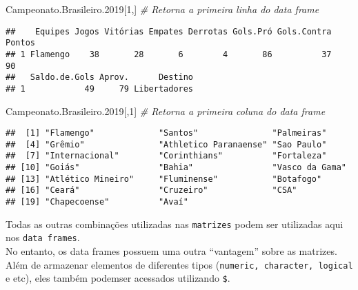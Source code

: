\documentclass[
]{book}
\newenvironment{Shaded}{\begin{snugshade}}{\end{snugshade}}
\newcommand{\CommentTok}[1]{\textcolor[rgb]{0.56,0.35,0.01}{\textit{#1}}}
\newcommand{\DecValTok}[1]{\textcolor[rgb]{0.00,0.00,0.81}{#1}}
\newcommand{\FloatTok}[1]{\textcolor[rgb]{0.00,0.00,0.81}{#1}}
\newcommand{\NormalTok}[1]{#1}
\newcommand{\SpecialCharTok}[1]{\textcolor[rgb]{0.00,0.00,0.00}{#1}}
\begin{document}
\begin{Shaded}
\begin{Highlighting}[]
\NormalTok{Campeonato.Brasileiro}\FloatTok{.2019}\NormalTok{[}\DecValTok{1}\NormalTok{,] }\CommentTok{\# Retorna a primeira linha do data frame}
\end{Highlighting}
\end{Shaded}

\begin{verbatim}
##    Equipes Jogos Vitórias Empates Derrotas Gols.Pró Gols.Contra Pontos
## 1 Flamengo    38       28       6        4       86          37     90
##   Saldo.de.Gols Aprov.      Destino
## 1            49     79 Libertadores
\end{verbatim}

\begin{Shaded}
\begin{Highlighting}[]
\NormalTok{Campeonato.Brasileiro}\FloatTok{.2019}\NormalTok{[,}\DecValTok{1}\NormalTok{] }\CommentTok{\# Retorna a primeira coluna do data frame}
\end{Highlighting}
\end{Shaded}

\begin{verbatim}
##  [1] "Flamengo"             "Santos"               "Palmeiras"           
##  [4] "Grêmio"               "Athletico Paranaense" "Sao Paulo"           
##  [7] "Internacional"        "Corinthians"          "Fortaleza"           
## [10] "Goiás"                "Bahia"                "Vasco da Gama"       
## [13] "Atlético Mineiro"     "Fluminense"           "Botafogo"            
## [16] "Ceará"                "Cruzeiro"             "CSA"                 
## [19] "Chapecoense"          "Avaí"
\end{verbatim}

Todas as outras combinações utilizadas nas \texttt{matrizes} podem ser utilizadas aqui nos \texttt{data\ frames}.\\
No entanto, os data frames possuem uma outra ``vantagem'' sobre as matrizes. Além de armazenar elementos de diferentes tipos (\texttt{numeric,\ character,\ logical} e etc), eles também podemser acessados utilizando \texttt{\$}.

\begin{Shaded}
\end{Shaded}
\end{document}
